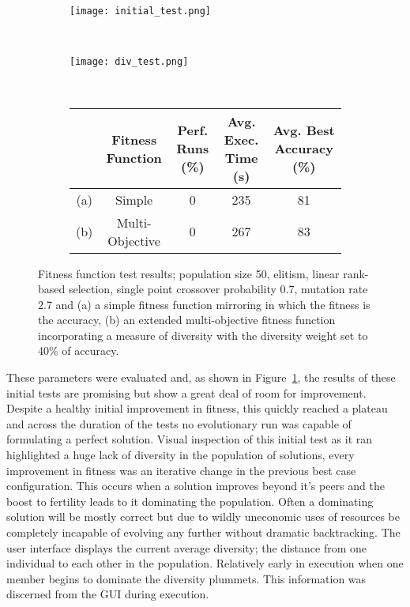 \begin{figure}
	\centering
	\begin{subfigure}[ht]{0.49\textwidth}
		\texttt{[image: initial\_test.png]}
		\caption{}
		\label{fig:initial}
		\vspace{1em}
	\end{subfigure}
	~
	\begin{subfigure}[ht]{0.49\textwidth}
		\texttt{[image: div\_test.png]}
		\caption{}
		\label{fig:initial_div}
		\vspace{1em}
	\end{subfigure}
	~
	\begin{subfigure}[ht]{\textwidth}
		\centering
		\begin{tabular}{ccccc}
			\toprule
			& \bfseries{Fitness Function} &
			\bfseries{Perf. Runs (\%)} &
			\bfseries{Avg. Exec. Time (s)} & \bfseries{Avg. Best Accuracy (\%)}\\
			\midrule
			(a) & Simple & 0 & 235 & 81\\
			(b) & Multi-Objective & 0 & 267 & 83\\
			\bottomrule
		\end{tabular}
	\end{subfigure}

	\caption[Fitness function test results]{Fitness function test results;
		population size 50, elitism, linear rank-based selection, single point
		crossover probability 0.7, mutation rate 2.7 and
		(a) a simple fitness function mirroring \cite{10.1007/3-540-63173-9_61} in
		which the fitness is the accuracy,
		(b) an extended multi-objective fitness function incorporating a measure
		of diversity with the diversity weight set to 40\% of accuracy.}
\end{figure}

These parameters were evaluated and, as shown in Figure~\ref{fig:initial},
the results of these initial tests are
promising but show a great deal of room for improvement. Despite a healthy
initial improvement in fitness, this quickly reached a plateau and
across the duration of the tests no evolutionary run was
capable of formulating a perfect solution.
Visual inspection of this initial test as it ran highlighted a huge lack of
diversity in the population of solutions, every improvement in fitness was
an iterative change in the previous best case configuration. This occurs
when a solution improves beyond it's peers and the boost to fertility leads to
it dominating the population. Often a dominating solution will be mostly
correct but due to wildly uneconomic uses of resources be completely incapable
of evolving any further without dramatic backtracking. The user interface displays
the current average diversity; the distance from one individual to each other in the
population. Relatively early in execution when one member begins to dominate the
diversity plummets. This information was discerned from the GUI during execution.


